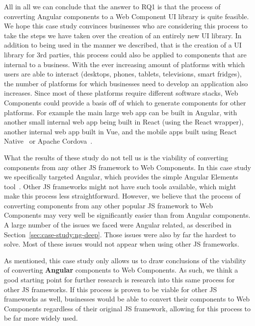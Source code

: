 All in all we can conclude that the answer to RQ1 is that the process of converting Angular components to a Web Component UI library is quite feasible. We hope this case study convinces businesses who are considering this process to take the steps we have taken over the creation of an entirely new UI library. In addition to being used in the manner we described, that is the creation of a UI library for 3rd parties, this process could also be applied to components that are internal to a business. With the ever increasing amount of platforms with which users are able to interact (desktops, phones, tablets, televisions, smart fridges), the number of platforms for which businesses need to develop an application also increases. Since most of these platforms require different software stacks, Web Components could provide a basis off of which to generate components for other platforms. For example the main large web app can be built in Angular, with another small internal web app being built in React (using the React wrapper), another internal web app built in Vue, and the mobile apps built using React Native~ or Apache Cordova~.

What the results of these study do not tell us is the viability of converting components from any other JS framework to Web Components. In this case study we specifically targeted Angular, which provides the simple Angular Elements tool~. Other JS frameworks might not have such tools available, which might make this process less straightforward. However, we believe that the process of converting components from any other popular JS framework to Web Components may very well be significantly easier than from Angular components. A large number of the issues we faced were Angular related, as described in Section~\ref{sec:case-study:ng-deep}. Those issues were also by far the hardest to solve. Most of these issues would not appear when using other JS frameworks.

As mentioned, this case study only allows us to draw conclusions of the viability of converting \textbf{Angular} components to Web Components. As such, we think a good starting point for further research is research into this same process for other JS frameworks. If this process is proven to be viable for other JS frameworks as well, businesses would be able to convert their components to Web Components regardless of their original JS framework, allowing for this process to be far more widely used.